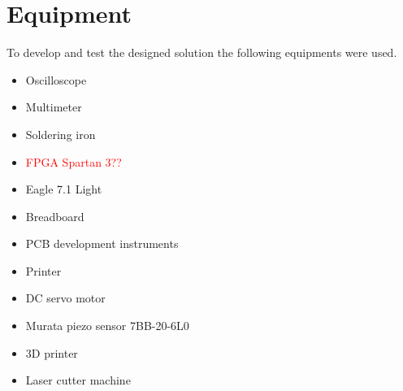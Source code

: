 	\section{Equipment}
	\label{sec:equipment}
		To develop and test the designed solution the following equipments were used.
		\begin{itemize}
			\item Oscilloscope
			\item Multimeter
			\item Soldering iron
			\item \textcolor{red}{FPGA Spartan 3??}
			\item Eagle 7.1 Light
			\item Breadboard
			\item PCB development instruments
			\item Printer
			\item DC servo motor
			\item Murata piezo sensor 7BB-20-6L0
			\item 3D printer
			\item Laser cutter machine
		\end{itemize}